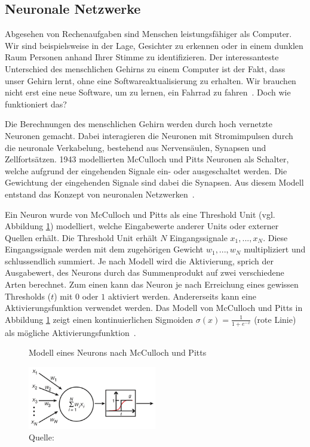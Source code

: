 \subsection{Neuronale Netzwerke}
\label{chap:neuron}

Abgesehen von Rechenaufgaben sind Menschen leistungsfähiger als Computer. Wir sind beispielsweise in der Lage, Gesichter zu erkennen oder in einem dunklen Raum Personen anhand Ihrer Stimme zu identifizieren. Der interessanteste Unterschied des menschlichen Gehirns zu einem Computer ist der Fakt, dass unser Gehirn lernt, ohne eine Softwareaktualisierung zu erhalten. Wir brauchen nicht erst eine neue Software, um zu lernen, ein Fahrrad zu fahren~\autocite{Krogh2008}. Doch wie funktioniert das?

Die Berechnungen des menschlichen Gehirn werden durch hoch vernetzte Neuronen gemacht. Dabei interagieren die Neuronen mit Stromimpulsen durch die neuronale Verkabelung, bestehend aus Nervensäulen, Synapsen und Zellfortsätzen. 1943 modellierten McCulloch und Pitts Neuronen als Schalter, welche aufgrund der eingehenden Signale ein- oder ausgeschaltet werden. Die Gewichtung der eingehenden Signale sind dabei die Synapsen. Aus diesem Modell entstand das Konzept von neuronalen Netzwerken~\autocite{Krogh2008}.

Ein Neuron wurde von McCulloch und Pitts als eine Threshold Unit (vgl. Abbildung \ref{krogh:a}) modelliert, welche Eingabewerte anderer Units oder externer Quellen erhält. Die Threshold Unit erhält $N$ Eingangssignale $x_1, ..., x_N$. Diese Eingangssignale werden mit dem zugehörigen Gewicht $w_1, ..., w_N$ multipliziert und schlussendlich summiert. Je nach Modell wird die Aktivierung, sprich der Ausgabewert, des Neurons durch das Summenprodukt auf zwei verschiedene Arten berechnet. Zum einen kann das Neuron je nach Erreichung eines gewissen Thresholds ($t$) mit $0$ oder $1$ aktiviert werden. Andererseits kann eine Aktivierungsfunktion verwendet werden. Das Modell von McCulloch und Pitts in Abbildung \ref{krogh:a} zeigt einen kontinuierlichen Sigmoiden $\sigma(x) = \frac{1}{1+e^{-x}}$ (rote Linie) als mögliche Aktivierungsfunktion~\autocite{Krogh2008}. 

\begin{figure}[h!]
    \captionsetup{width=.9\linewidth}
    \caption{Modell eines Neurons nach McCulloch und Pitts}
    \label{krogh:a}
    \centering
    \includegraphics[width=0.5\textwidth]{graphics/krogh/krogh_neural-network.png}
    \vspace*{0.3cm}
    \caption*{Quelle: \textcite{Krogh2008}}
\end{figure}

